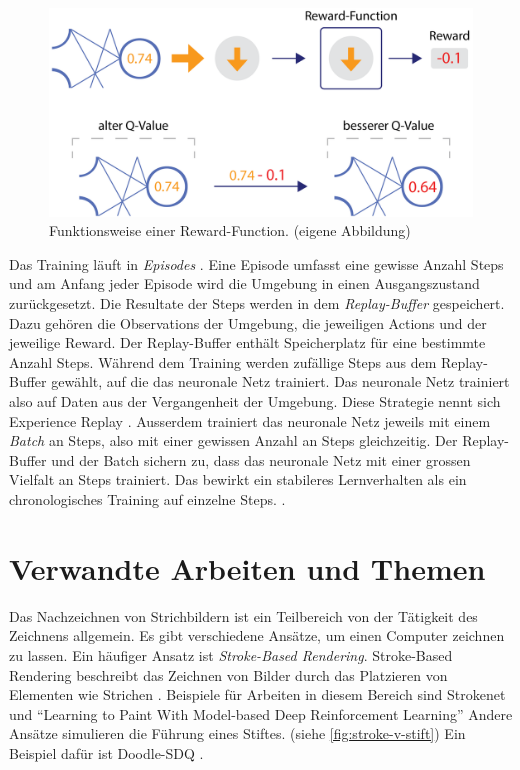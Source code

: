 \begin{figure}[!ht]
   \centering
   \includegraphics[width=\textwidth-2.2cm]{images/theorie/reinforce-2.png}
   \caption{Funktionsweise einer Reward-Function. (eigene Abbildung)}\label{fig:reinforce-2}
\end{figure}
 
Das Training läuft in \emph{Episodes} \cite[S. 14]{sutton_reinforcement_2014}.
Eine Episode umfasst eine gewisse Anzahl Steps und am Anfang jeder Episode wird
die Umgebung in einen Ausgangszustand zurückgesetzt. Die Resultate der Steps
werden in dem \emph{Replay-Buffer} gespeichert. Dazu gehören die Observations
der Umgebung, die jeweiligen Actions und der jeweilige Reward. Der
Replay-Buffer enthält Speicherplatz für eine bestimmte Anzahl Steps. Während dem
Training werden zufällige Steps aus dem Replay-Buffer gewählt, auf die das
neuronale Netz trainiert. Das neuronale Netz trainiert also auf Daten aus der
Vergangenheit der Umgebung. Diese Strategie nennt sich Experience Replay
\cite[S. 5]{mnih_playing_2013}. Ausserdem trainiert das neuronale Netz jeweils
mit einem \emph{Batch} an Steps, also mit einer gewissen Anzahl an Steps
gleichzeitig. Der Replay-Buffer und der Batch sichern zu, dass das neuronale
Netz mit einer grossen Vielfalt an Steps trainiert. Das bewirkt ein stabileres
Lernverhalten als ein chronologisches Training auf einzelne Steps.
\cite{phd_how_2021}.

\section{Verwandte Arbeiten und Themen}\label{chap:t_ver} Das Nachzeichnen von
Strichbildern ist ein Teilbereich von der Tätigkeit des Zeichnens allgemein. Es
gibt verschiedene Ansätze, um einen Computer zeichnen zu lassen. Ein häufiger
Ansatz ist \emph{Stroke-Based Rendering}. Stroke-Based Rendering beschreibt das
Zeichnen von Bilder durch das Platzieren von Elementen wie Strichen
\cite{aaron_hertzmann_stroke-based_2002}. Beispiele für Arbeiten in diesem Bereich sind
Strokenet \cite{zheng_strokenet_2018} und ``Learning to Paint With Model-based
Deep Reinforcement Learning'' \cite{huang_learning_2019} Andere Ansätze
simulieren die Führung eines Stiftes. (siehe \autoref{fig:stroke-v-stift}) Ein
Beispiel dafür ist Doodle-SDQ \cite{zhou_learning_2018}.
 
